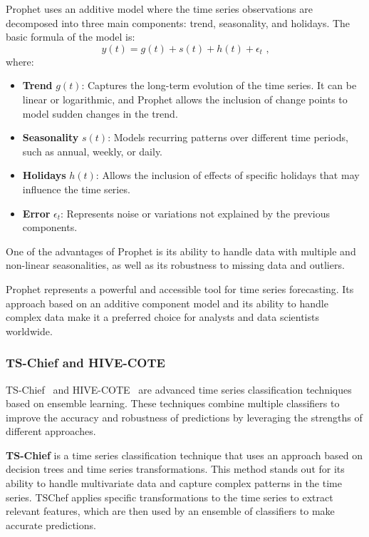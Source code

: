 Prophet uses an additive model where the time series observations are decomposed into three main components: trend, seasonality, and holidays. The basic formula of the model is:
\begin{equation}
y(t) = g(t) + s(t) + h(t) + \epsilon_t \text{ ,}
\end{equation}where:
\begin{itemize}
    \item \textbf{Trend} \(g(t)\): Captures the long-term evolution of the time series. It can be linear or logarithmic, and Prophet allows the inclusion of change points to model sudden changes in the trend.
    \item \textbf{Seasonality} \(s(t)\): Models recurring patterns over different time periods, such as annual, weekly, or daily.
    \item \textbf{Holidays} \(h(t)\): Allows the inclusion of effects of specific holidays that may influence the time series.
    \item \textbf{Error} \(\epsilon_t\): Represents noise or variations not explained by the previous components.
\end{itemize}

One of the advantages of Prophet is its ability to handle data with multiple and non-linear seasonalities, as well as its robustness to missing data and outliers.

Prophet represents a powerful and accessible tool for time series forecasting. Its approach based on an additive component model and its ability to handle complex data make it a preferred choice for analysts and data scientists worldwide.
\vspace{10pt}

\subsubsection{TS-Chief and HIVE-COTE}
TS-Chief~\cite{Shifaz_2020} and HIVE-COTE~\cite{7837946} are advanced time series classification techniques based on ensemble learning. These techniques combine multiple classifiers to improve the accuracy and robustness of predictions by leveraging the strengths of different approaches.
\vspace{10pt}

\textbf{TS-Chief} is a time series classification technique that uses an approach based on decision trees and time series transformations. This method stands out for its ability to handle multivariate data and capture complex patterns in the time series. TSChef applies specific transformations to the time series to extract relevant features, which are then used by an ensemble of classifiers to make accurate predictions.
\vspace{10pt}


